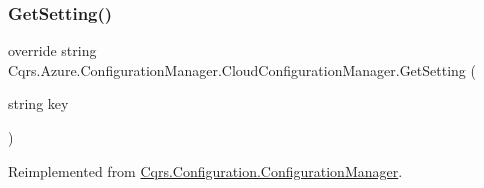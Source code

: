 \subsubsection{\texorpdfstring{Get\+Setting()}{GetSetting()}}
{\footnotesize\ttfamily override string Cqrs.\+Azure.\+Configuration\+Manager.\+Cloud\+Configuration\+Manager.\+Get\+Setting (\begin{DoxyParamCaption}\item[{string}]{key }\end{DoxyParamCaption})\hspace{0.3cm}{\ttfamily [virtual]}}



Reimplemented from \hyperlink{classCqrs_1_1Configuration_1_1ConfigurationManager_ac3e31af665b95b781fee23f577170a63_ac3e31af665b95b781fee23f577170a63}{Cqrs.\+Configuration.\+Configuration\+Manager}.


